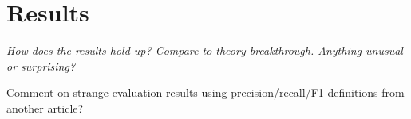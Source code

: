 
\section{Results}\label{sec:disc:results}

\textit{How does the results hold up? Compare to theory breakthrough. Anything unusual or surprising?}

Comment on strange evaluation results using precision/recall/F1 definitions from another article?


